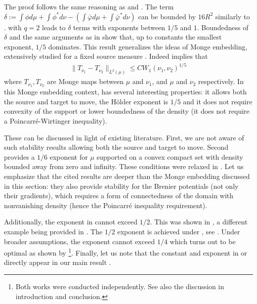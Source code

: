 \documentclass[11pt]{article}
\newenvironment{sproof}{%
  \renewcommand{\proofname}{Sketch of proof}\proof}{\endproof}
\newcommand{\1}{\mathbbm{1}}
\numberwithin{equation}{section}
\begin{document}
\begin{sproof}
    The proof follows the same reasoning as  and . The term $\delta:=\int\phi d\mu+\int \phi^*d\nu-\left( \int \bar{\varphi}d\mu+\int \bar{\varphi}^*d\nu \right)$ can be bounded by $16R^2$ similarly to .  with $q=2$ leads to $\delta$ terms with exponents between $1/5$ and $1$. Boundedness of $\delta$ and the same arguments as in  show that, up to constants the smallest exponent, $1/5$ dominates.
\end{sproof}
This result generalizes the ideas of Monge embedding, extensively studied for a fixed source measure \cite{gigli2011holder,merigot2020quantitative,delalande2023quantitative,carlier2025quantitative}. Indeed   implies that
\begin{align}
    \|T_{\nu_1} - T_{\nu_2}\|_{L^2(\mu)} \leq CW_1(\nu_1,\nu_2)^{1/5}
    \label{eq:mongeEmbeddingHolder}
\end{align}
where $T_{\nu_1}, T_{\nu_2}$ are Monge maps between $\mu$ and $\nu_1$, and $\mu$ and $\nu_2$ respectively. In this Monge embedding context,  has several interesting properties: it allows both the source and target to move, the H\"older exponent is $1/5$ and it does not require convexity of the support or lower boundedness of the density (it does not require a Poincarré-Wirtinger inequality).

These can be discussed in light of existing literature. First, we are not aware of such stability results allowing both the source and target to move. Second \cite[Theorem 4.2]{delalande2023quantitative} provides a $1/6$ exponent for $\mu$ supported on a convex compact set with density bounded away from zero and infinity. These conditions were relaxed in \cite{letrouit2024gluing}. Let us emphasize that the cited results are deeper than the Monge embedding discussed in this section: they also provide stability for the Brenier potentials (not only their gradients), which requires a form of connectedness of the domain with nonvanishing density (hence the Poincarré inequality requirement).


Additionally, the exponent in  cannot exceed $1/2$. This was shown in \cite{gigli2011holder}, a different example being provided in \cite[Proposition 2.1]{merigot2020quantitative}. The $1/2$ exponent is achieved under , see \cite[Proposition 10]{hutter2021minimax}. Under broader assumptions, the exponent cannot exceed $1/4$ \cite{letrouit2025unstable} which turns out to be optimal as shown by \cite{merigot2026sharp}\footnote{Both works were conducted independently. See also the discussion in introduction and conclusion.}. Finally, let us note that the constant and exponent in  or  directly appear in our main result .
\end{document}

